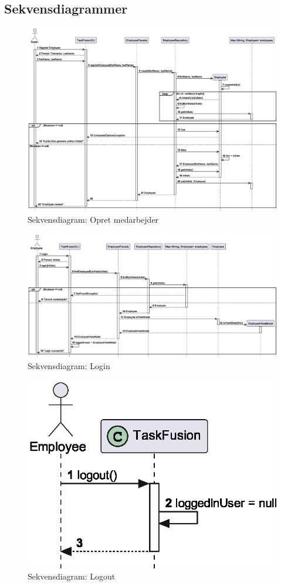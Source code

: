 \subsection{Sekvensdiagrammer}\label{sec:sequence}
\begin{figure}[H]
    \centering
    \caption{Sekvensdiagram: Opret medarbejder}\label{fig:sequenceRegisterEmployee}
    \includegraphics[width=\textwidth]{RequirementsAndDesign/SequenceDiagrams/seqRegisterEmployee.eps}
\end{figure}
\begin{figure}[H]
    \centering
    \caption{Sekvensdiagram: Login}\label{fig:sequenceLogin}
    \includegraphics[width=\textwidth]{RequirementsAndDesign/SequenceDiagrams/seqLogin.eps}
\end{figure}
\begin{figure}[H]
    \centering
    \caption{Sekvensdiagram: Logout}\label{fig:sequenceLogout}
    \includegraphics[width=.3\textwidth]{RequirementsAndDesign/SequenceDiagrams/seqLogout.eps}
\end{figure}
